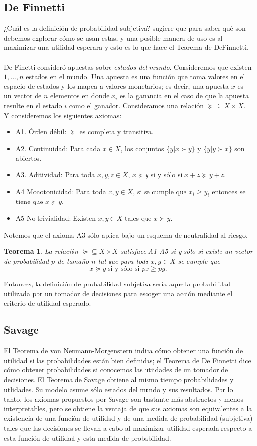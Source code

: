 \documentclass[11pt]{article}
\theoremstyle{plain}
\newtheorem{teo}{Teorema}
\begin{document}
\subsection{De Finnetti}
¿Cuál es la definición de probabilidad subjetiva? \cite{gilboa2009decision} sugiere que para saber qué son debemos explorar cómo se usan estas, y una posible manera de uso es al maximizar una utilidad esperara y esto es lo que hace el Teorema de DeFinnetti.\\
\\
De Finetti consideró apuestas sobre \textit{estados del mundo}. Consideremos que existen $1,...,n$ estados en el mundo. Una apuesta es una función que toma valores en el espacio de estados y los mapea a valores monetarios; es decir, una apuesta $x$ es un vector de $n$ elementos en donde $x_i$ es la ganancia en el caso de que la apuesta resulte en el estado $i$ como el ganador. Consideramos una relación $\succeq \subseteq X \times X$. Y consideremos los siguientes axiomas:
\begin{itemize}
\item A1. Órden débil: $\succeq$ es completa y transitiva.
\item A2. Continuidad: Para cada $x \in X$, los conjuntos $\{ y | x \succ y \}$ y $\{ y | y \succ x \}$ son abiertos.
\item A3. Aditividad: Para toda $x,y,z \in X$, $x \succeq y$ si y sólo si $x+z \succeq y+z$.
\item A4 Monotonicidad: Para toda $x,y \in X$, si se cumple que $x_i \geq y_i$ entonces se tiene que $x \succeq y$.
\item A5 No-trivialidad: Existen $x,y \in X$ tales que $x \succ y$.
\end{itemize}
Notemos que el axioma A3 sólo aplica bajo un esquema de neutralidad al riesgo.
\begin{teo}
La relación $\succeq \subseteq X \times X$ satisface A1-A5 si y sólo si existe un vector de probabilidad $p$ de tamaño $n$ tal que para toda $x,y \in X$ se cumple que
\[ x \succeq y \textrm { si y sólo si } px \geq py. \]
\end{teo}
Entonces, la definición de probabilidad subjetiva sería aquella probabilidad utilizada por un tomador de decisiones para escoger una acción mediante el criterio de utilidad esperado.
\subsection{Savage}
El Teorema de von Neumann-Morgenstern indica cómo obtener una función de utilidad si las probabilidades están bien definidas; el Teorema de De Finnetti dice cómo obtener probabilidades si conocemos las utiidades de un tomador de decisiones. El Teorema de Savage obtiene al mismo tiempo probabilidades y utlidades. Su modelo asume sólo estados del mundo y sus resultados. Por lo tanto, los axiomas propuestos por Savage son bastante más abstractos y menos interpretables, pero se obtiene la ventaja de que sus axiomas son equivalentes a la existencia de una función de utilidad y de una medida de probabilidad (subjetiva) tales que las decisiones se llevan a cabo al maximizar utilidad esperada respecto a esta función de utilidad y esta medida de probabilidad.\\
\end{document}
